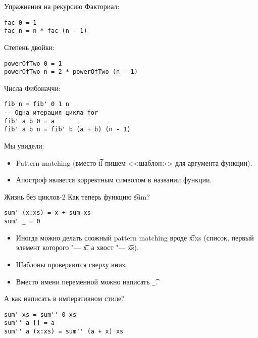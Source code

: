 \begin{frame}[t,fragile]{Упражнения на рекурсию}
	Факториал:
\begin{verbatim}
fac 0 = 1
fac n = n * fac (n - 1)
\end{verbatim}
	Степень двойки: \pause
\begin{verbatim}
powerOfTwo 0 = 1
powerOfTwo n = 2 * powerOfTwo (n - 1)
\end{verbatim}
	Числа Фибоначчи: \pause
\begin{verbatim}
fib n = fib' 0 1 n
-- Одна итерация цикла for
fib' a b 0 = a
fib' a b n = fib' b (a + b) (n - 1)
\end{verbatim}
	Мы увидели:
	\begin{itemize}
		\item Pattern matching (вместо \t{if} пишем <<шаблон>> для аргумента функции).
		\item Апостроф является корректным символом в названии функции.
	\end{itemize}
\end{frame}

\begin{frame}[t,fragile]{Жизнь без циклов-2}
	Как теперь функцию \t{sum}? \pause
\begin{verbatim}
sum' (x:xs) = x + sum xs
sum' _ = 0
\end{verbatim}
	\begin{itemize}
		\item Иногда можно делать сложный pattern matching вроде \t{x:xs} (список, первый элемент которого "--- \t{x}, а хвост "--- \t{xs}).
		\item Шаблоны проверяются сверху вниз.
		\item Вместо имени переменной можно написать \t{\_}.
	\end{itemize}
	А как написать в императивном стиле? \pause
\begin{verbatim}
sum' xs = sum'' 0 xs
sum'' a [] = a
sum'' a (x:xs) = sum'' (a + x) xs
\end{verbatim}
\end{frame}
